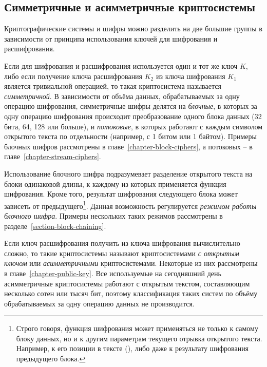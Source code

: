 \subsection{Симметричные и асимметричные криптосистемы}

Криптографические системы и шифры можно разделить на две большие группы в зависимости от принципа использования ключей для шифрования и расшифрования.

Если для шифрования и расшифрования используется один и тот же ключ $K$, либо если получение ключа расшифрования $K_2$ из ключа шифрования $K_1$ является тривиальной операцией, то такая криптосистема называется \emph{симметричной}. В зависимости от объёма данных, обрабатываемых за одну операцию шифрования, симметричные шифры делятся на \emph{блочные}, в которых за одну операцию шифрования происходит преобразование одного блока данных (32 бита, 64, 128 или больше), и \emph{потоковые}, в которых работают с каждым символом открытого текста по отдельности (например, с 1 битом или 1 байтом). Примеры блочных шифров рассмотрены в главе~\ref{chapter-block-ciphers}, а потоковых -- в главе~\ref{chapter-stream-ciphers}.

Использование блочного шифра подразумевает разделение открытого текста на блоки одинаковой длины, к каждому из которых применяется функция шифрования. Кроме того, результат шифрования следующего блока может зависеть от предыдущего\footnote{Строго говоря, функция шифрования может применяться не только к самому блоку данных, но и к другим параметрам текущего отрывка открытого текста. Например, к его позиции в тексте (), либо даже к результату шифрования предыдущего блока.}. Данная возможность регулируется \emph{режимом работы блочного шифра}. Примеры нескольких таких режимов рассмотрены в разделе~\ref{section-block-chaining}.

Если ключ расшифрования получить из ключа шифрования вычислительно сложно, то такие криптосистемы называют криптосистемами \emph{с открытым ключом} или \emph{асимметричными} криптосистемами. Некоторые из них рассмотрены в главе~\ref{chapter-public-key}. Все используемые на сегодняшний день асимметричные криптосистемы работают с открытым текстом, составляющим несколько сотен или тысяч бит, поэтому классификация таких систем по объёму обрабатываемых за одну операцию данных не производится.

